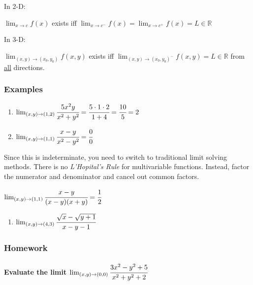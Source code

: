 \documentclass[
  letterpaper,
  DIV=11,
  numbers=noendperiod]{scrartcl}
\let\oldparagraph\paragraph
\renewcommand{\paragraph}[1]{\oldparagraph{#1}\mbox{}}
\providecommand{\tightlist}{%
  \setlength{\itemsep}{0pt}\setlength{\parskip}{0pt}}\usepackage{longtable,booktabs,array}
\begin{document}
In 2-D:

\(\lim_{x\rightarrow c} f(x)\) exists iff
\(\lim_{x\rightarrow c^-} f(x) = \lim_{x\rightarrow c^+} f(x) = L \in \mathbb{R}\)

In 3-D:

\(\lim_{(x, y) \rightarrow (x_0, y_0)} f(x, y)\) exists iff
\(\lim_{(x, y) \rightarrow (x_0, y_0)^-} f(x, y) = L \in \mathbb{R}\)
from \ul{all} directions.

\subsubsection{Examples}\label{examples-3}

\begin{enumerate}
\def\labelenumi{\arabic{enumi}.}
\item
  \(\lim_{(x, y) \rightarrow (1, 2)} \cfrac{5x^2y}{x^2+y^2} = \cfrac{5 \cdot 1 \cdot 2}{1 + 4} = \cfrac{10}{5} = 2\)
\item
  \(\lim_{(x, y) \rightarrow (1, 1)} \cfrac{x-y}{x^2-y^2} = \cfrac{0}{0}\)
\end{enumerate}

Since this is indeterminate, you need to switch to traditional limit
solving methods. There is no \emph{L'Hopital's Rule} for multivariable
functions. Instead, factor the numerator and denominator and cancel out
common factors.

\(\lim_{(x, y) \rightarrow (1, 1)} \cfrac{x-y}{(x-y)(x+y)} = \cfrac{1}{2}\)

\begin{enumerate}
\def\labelenumi{\arabic{enumi}.}
\setcounter{enumi}{2}
\tightlist
\item
  \(\lim_{(x, y) \rightarrow (4, 3)} \cfrac{\sqrt{x}-\sqrt{y+1}}{x-y-1}\)
\end{enumerate}

\subsubsection{Homework}\label{homework}

\paragraph{\texorpdfstring{Evaluate the limit
\(\lim_{(x, y) \rightarrow (0, 0)} \cfrac{3x^2-y^2+5}{x^2+y^2+2}\)}{Evaluate the limit \textbackslash lim\_\{(x, y) \textbackslash rightarrow (0, 0)\} \textbackslash cfrac\{3x\^{}2-y\^{}2+5\}\{x\^{}2+y\^{}2+2\}}}\label{evaluate-the-limit-lim_x-y-rightarrow-0-0-cfrac3x2-y25x2y22}
\end{document}
